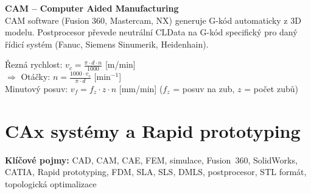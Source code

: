 \documentclass[a4paper,10pt]{article}
\begin{document}
\begin{vysvetlenibox}
\textbf{CAM -- Computer Aided Manufacturing}\\
CAM software (Fusion 360, Mastercam, NX) generuje G-kód automaticky
z 3D modelu. Postprocesor převede neutrální CLData na G-kód specifický
pro daný řídicí systém (Fanuc, Siemens Sinumerik, Heidenhain).

\begin{vzorcebox}
Řezná rychlost: $v_c = \frac{\pi \cdot d \cdot n}{1000}$ [m/min]\\
$\Rightarrow$ Otáčky: $n = \frac{1000 \cdot v_c}{\pi \cdot d}$ [min$^{-1}$]\\
Minutový posuv: $v_f = f_z \cdot z \cdot n$ [mm/min]
\quad ($f_z$ = posuv na zub, $z$ = počet zubů)
\end{vzorcebox}
\end{vysvetlenibox}

\section{CAx systémy a Rapid prototyping}

\begin{pojmybox}
\textbf{Klíčové pojmy:}
CAD, CAM, CAE, FEM, simulace, Fusion~360, SolidWorks, CATIA,
Rapid prototyping, FDM, SLA, SLS, DMLS, postprocesor,
STL formát, topologická optimalizace
\end{pojmybox}
\end{document}
